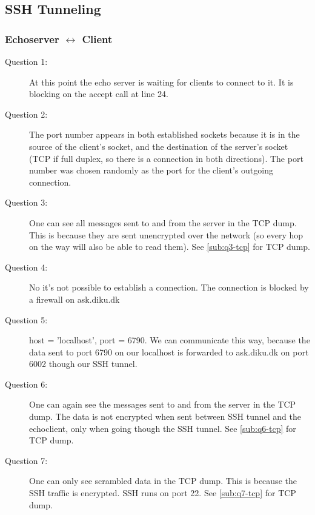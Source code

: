 \subsection{SSH Tunneling}
\subsubsection{{\sc Echoserver} $\leftrightarrow$ {\sc Client}}
\begin{description}
    \item[Question 1:] At this point the echo server is waiting for clients to connect to it. It is blocking on
        the accept call at line 24.
    \item[Question 2:] The port number appears in both established sockets because it is in the source of the client's
        socket, and the destination of the server's socket (TCP if full duplex, so there is a connection in both directions).
        The port number was chosen randomly as the port for the client's outgoing connection.
    \item[Question 3:] One can see all messages sent to and from the server in the TCP dump. This is because they are sent
        unencrypted over the network (so every hop on the way will also be able to read them). See \autoref{sub:q3-tcp} for TCP dump.
    \item[Question 4:] No it's not possible to establish a connection. The connection is blocked by a firewall on ask.diku.dk %
    \item[Question 5:]  host = 'localhost', port = 6790. We can communicate this way, because the data sent to port 6790 on our localhost is forwarded to ask.diku.dk on port 6002 though our SSH tunnel.
    \item[Question 6:] One can again see the messages sent to and from the server in the TCP dump. The data is not encrypted when sent between SSH tunnel and the echoclient, only when going though the SSH tunnel. See \autoref{sub:q6-tcp} for TCP dump.

    \item[Question 7:] One can only see scrambled data in the TCP dump. This is because the SSH traffic is encrypted. SSH runs on port 22. See \autoref{sub:q7-tcp} for TCP dump.


\end{description}
